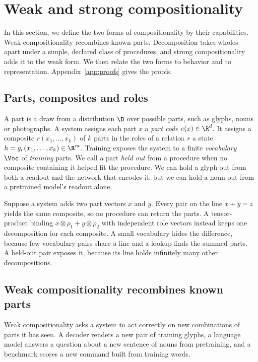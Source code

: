 \section{Weak and strong compositionality}
\label{sec:definition}

In this section, we define the two forms of compositionality by their capabilities. Weak compositionality recombines known parts. Decomposition takes wholes apart under a simple, declared class of procedures, and strong compositionality adds it to the weak form. We then relate the two forms to behavior and to representation. Appendix~\ref{app:proofs} gives the proofs.

\subsection{Parts, composites and roles}
\label{sec:intuition}

A part is a draw from a distribution $\D$ over possible parts, such as glyphs, nouns or photographs. A system assigns each part $x$ a \emph{part code} $e(x) \in \R^d$. It assigns a composite $r(x_1, \ldots, x_k)$ of $k$ parts in the roles of a relation $r$ a state $h = g_r(x_1, \ldots, x_k) \in \R^m$. Training exposes the system to a finite \emph{vocabulary} $\Voc$ of \emph{training} parts. We call a part \emph{held out} from a procedure when no composite containing it helped fit the procedure. We can hold a glyph out from both a readout and the network that encodes it, but we can hold a noun out from a pretrained model's readout alone.

Suppose a system adds two part vectors $x$ and $y$. Every pair on the line $x + y = z$ yields the same composite, so no procedure can return the parts. A tensor-product binding $x \otimes \rho_1 + y \otimes \rho_2$ with independent role vectors \citep{smolensky1990} instead keeps one decomposition for each composite. A small vocabulary hides the difference, because few vocabulary pairs share a line and a lookup finds the summed parts. A held-out pair exposes it, because its line holds infinitely many other decompositions.

\subsection{Weak compositionality recombines known parts}
\label{sec:notions}

Weak compositionality asks a system to act correctly on new combinations of parts it has seen. A decoder renders a new pair of training glyphs, a language model answers a question about a new sentence of nouns from pretraining, and a benchmark scores a new command built from training words.


